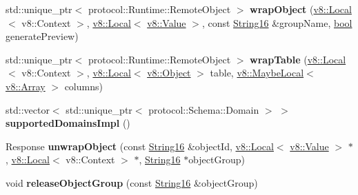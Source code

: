 \begin{DoxyCompactItemize}
std\+::unique\+\_\+ptr$<$ protocol\+::\+Runtime\+::\+Remote\+Object $>$ {\bfseries wrap\+Object} (\mbox{\hyperlink{classv8_1_1Local}{v8\+::\+Local}}$<$ v8\+::\+Context $>$, \mbox{\hyperlink{classv8_1_1Local}{v8\+::\+Local}}$<$ \mbox{\hyperlink{classv8_1_1Value}{v8\+::\+Value}} $>$, const \mbox{\hyperlink{classv8__inspector_1_1String16}{String16}} \&group\+Name, \mbox{\hyperlink{classbool}{bool}} generate\+Preview)
\item 
\mbox{\label{classv8__inspector_1_1V8InspectorSessionImpl_ac1421f97baa9e595ebe1361f2e2ddf3c}} 
std\+::unique\+\_\+ptr$<$ protocol\+::\+Runtime\+::\+Remote\+Object $>$ {\bfseries wrap\+Table} (\mbox{\hyperlink{classv8_1_1Local}{v8\+::\+Local}}$<$ v8\+::\+Context $>$, \mbox{\hyperlink{classv8_1_1Local}{v8\+::\+Local}}$<$ \mbox{\hyperlink{classv8_1_1Object}{v8\+::\+Object}} $>$ table, \mbox{\hyperlink{classv8_1_1MaybeLocal}{v8\+::\+Maybe\+Local}}$<$ \mbox{\hyperlink{classv8_1_1Array}{v8\+::\+Array}} $>$ columns)
\item 
\mbox{\label{classv8__inspector_1_1V8InspectorSessionImpl_a25f767f9a9309c1dd1a61d405b128691}} 
std\+::vector$<$ std\+::unique\+\_\+ptr$<$ protocol\+::\+Schema\+::\+Domain $>$ $>$ {\bfseries supported\+Domains\+Impl} ()
\item 
\mbox{\label{classv8__inspector_1_1V8InspectorSessionImpl_ac48a39baa4852e6c2019036bab00050c}} 
Response {\bfseries unwrap\+Object} (const \mbox{\hyperlink{classv8__inspector_1_1String16}{String16}} \&object\+Id, \mbox{\hyperlink{classv8_1_1Local}{v8\+::\+Local}}$<$ \mbox{\hyperlink{classv8_1_1Value}{v8\+::\+Value}} $>$ $\ast$, \mbox{\hyperlink{classv8_1_1Local}{v8\+::\+Local}}$<$ v8\+::\+Context $>$ $\ast$, \mbox{\hyperlink{classv8__inspector_1_1String16}{String16}} $\ast$object\+Group)
\item 
\mbox{\label{classv8__inspector_1_1V8InspectorSessionImpl_a8340dcfb45a32ce543273cfbf5367037}} 
void {\bfseries release\+Object\+Group} (const \mbox{\hyperlink{classv8__inspector_1_1String16}{String16}} \&object\+Group)
\item 
\mbox{\label{classv8__inspector_1_1V8InspectorSessionImpl_a657cc8d842fd297e7f06ecd7ce267dc2}} 

\end{DoxyCompactItemize}
